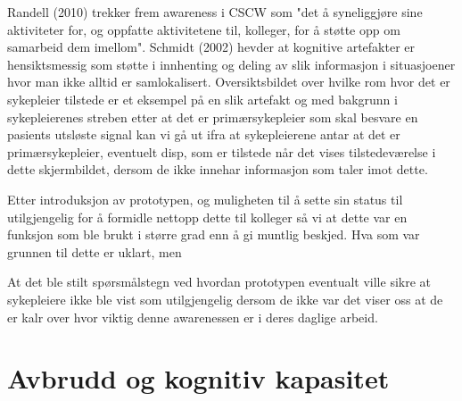 \noindent
Randell (2010) trekker frem awareness i CSCW som "det å syneliggjøre sine aktiviteter for, og oppfatte aktivitetene til, kolleger, for å støtte opp om samarbeid dem imellom". Schmidt (2002) hevder at kognitive artefakter er hensiktsmessig som støtte i innhenting og deling av slik informasjon i situasjoener hvor man ikke alltid er samlokalisert. Oversiktsbildet over hvilke rom hvor det er sykepleier tilstede er et eksempel på en slik artefakt og med bakgrunn i sykepleierenes streben etter at det er primærsykepleier som skal besvare en pasients utsløste signal kan vi gå ut ifra at sykepleierene antar at det er primærsykepleier, eventuelt disp, som er tilstede når det vises tilstedeværelse i dette skjermbildet, dersom de ikke innehar informasjon som taler imot dette.

Etter introduksjon av prototypen, og muligheten til å sette sin status til utilgjengelig
for å formidle nettopp dette til kolleger så vi at dette var en funksjon som ble brukt
i større grad enn å gi muntlig beskjed. Hva som var grunnen til dette er uklart, men 

\noindent
At det ble stilt spørsmålstegn ved hvordan prototypen eventualt ville sikre at sykepleiere ikke ble vist som utilgjengelig dersom de ikke var det viser oss at de er kalr over hvor viktig denne awarenessen er i deres daglige arbeid. 


\section{Avbrudd og kognitiv kapasitet}

